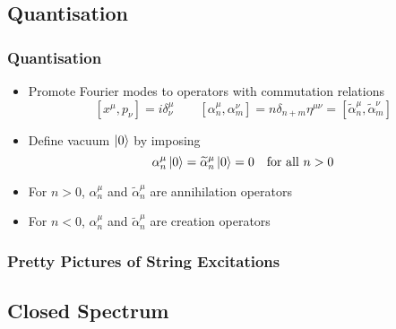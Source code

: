\documentclass{beamer}
\renewcommand{\tilde}{\widetilde}
\begin{document}
\subsection{Quantisation}




\begin{frame}
  \frametitle{Quantisation}
  \begin{itemize}
  \item Promote Fourier modes to operators with commutation relations
    \[ [x^{\mu}, p_{\nu} ] = i \delta^{\mu}_{\nu} \qquad [\alpha^{\mu}_{n}, \alpha^{\nu}_{m}] = n \delta_{n+m} \eta^{\mu\nu} = [\tilde \alpha^{\mu}_{n}, \tilde \alpha^{\nu}_{m}]  \] \pause
  \item Define vacuum $\ket 0$ by imposing
    \[ \alpha_{n}^{\mu} \ket 0 = \tilde \alpha_{n}^{\mu} \ket 0 = 0 \quad \text{for all } n>0 \]\pause
  \item For $n>0$,  $\alpha_{n}^{\mu}$ and $\tilde \alpha^{\mu}_{n}$ are annihilation operators
  \item For $n<0 $,   $\alpha^{\mu}_{n}$ and $\tilde \alpha^{\mu}_{n}$ are creation operators
  \end{itemize}
\end{frame}

\begin{frame}
\frametitle{Pretty Pictures of String Excitations}

  


\end{frame}

\subsection{Closed Spectrum}
\end{document}
